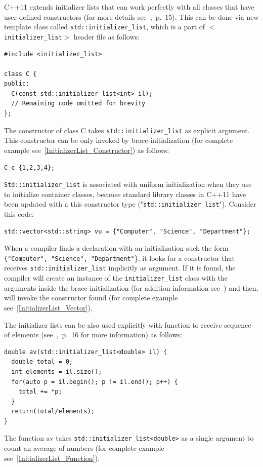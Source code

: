 \documentclass[11pt]{report}
\begin{document}
C++11 extends initializer lists that can work perfectly with all classes that have user-defined constructors (for more details see~\cite{Reddy:2011:API},~p.~15). This can be done via new template class called \texttt{std::initializer\_list}, which is a part of \texttt{$<$initializer\_list$>$} header file as follows:
\begin{lstlisting} 
#include <initializer_list>

class C {
public:
  C(const std::initializer_list<int> il);
  // Remaining code omitted for brevity
};
\end{lstlisting}
The constructor of class C takes \texttt{std::initializer\_list} as explicit argument. This constructor can be only invoked by brace-initialization (for complete example see~\ref{InitializerList_Constructor}) as follows: 
\begin{lstlisting}
C c {1,2,3,4};
\end{lstlisting}
\texttt{Std::initializer\_list} is associated with uniform initialization when they use to initialize container classes, because standard library classes in C++11 have been updated with a this constructor type ("\texttt{std::initializer\_list}"). Consider this code:
\begin{lstlisting}
std::vector<std::string> vu = {"Computer", "Science", "Department"};
\end{lstlisting}
When a compiler finds a declaration with an initialization suck the form \texttt{\{"Computer", "Science", "Department"}\}, it looks for a constructor that receives \texttt{std::initializer\_list} implicitly as argument. If it is found, the compiler will create an instance of the \texttt{initializer\_list} class with the arguments inside the brace-initialization (for addition information see~\cite{Stroustrup:2012:Cpp11}) and then, will invoke the constructor found (for complete example see~\ref{InitializerList_Vector}). 

The initializer lists can be also used explicitly with function to receive sequence of elements (see~\cite{Reddy:2011:API},~p.~16 for more information) as follows:
\begin{lstlisting}
double av(std::initializer_list<double> il) {
  double total = 0;
  int elements = il.size();
  for(auto p = il.begin(); p != il.end(); p++) {
    total += *p;
  }
  return(total/elements);
}
\end{lstlisting}
The function av takes \texttt{std::initializer\_list<double>} as a single argument to count an average of numbers (for complete example see~\ref{InitializerList_Function}).
\end{document}
